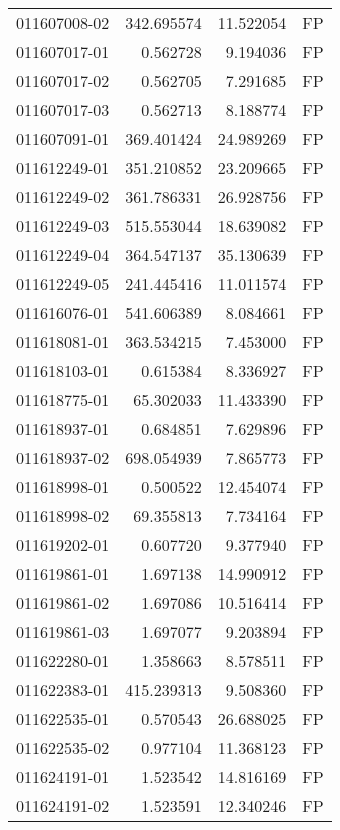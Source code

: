 \begin{tabular}{lrrl}
011607008-02 &  342.695574 &      11.522054 &   FP \\
011607017-01 &    0.562728 &       9.194036 &   FP \\
011607017-02 &    0.562705 &       7.291685 &   FP \\
011607017-03 &    0.562713 &       8.188774 &   FP \\
011607091-01 &  369.401424 &      24.989269 &   FP \\
011612249-01 &  351.210852 &      23.209665 &   FP \\
011612249-02 &  361.786331 &      26.928756 &   FP \\
011612249-03 &  515.553044 &      18.639082 &   FP \\
011612249-04 &  364.547137 &      35.130639 &   FP \\
011612249-05 &  241.445416 &      11.011574 &   FP \\
011616076-01 &  541.606389 &       8.084661 &   FP \\
011618081-01 &  363.534215 &       7.453000 &   FP \\
011618103-01 &    0.615384 &       8.336927 &   FP \\
011618775-01 &   65.302033 &      11.433390 &   FP \\
011618937-01 &    0.684851 &       7.629896 &   FP \\
011618937-02 &  698.054939 &       7.865773 &   FP \\
011618998-01 &    0.500522 &      12.454074 &   FP \\
011618998-02 &   69.355813 &       7.734164 &   FP \\
011619202-01 &    0.607720 &       9.377940 &   FP \\
011619861-01 &    1.697138 &      14.990912 &   FP \\
011619861-02 &    1.697086 &      10.516414 &   FP \\
011619861-03 &    1.697077 &       9.203894 &   FP \\
011622280-01 &    1.358663 &       8.578511 &   FP \\
011622383-01 &  415.239313 &       9.508360 &   FP \\
011622535-01 &    0.570543 &      26.688025 &   FP \\
011622535-02 &    0.977104 &      11.368123 &   FP \\
011624191-01 &    1.523542 &      14.816169 &   FP \\
011624191-02 &    1.523591 &      12.340246 &   FP \\

\end{tabular}

